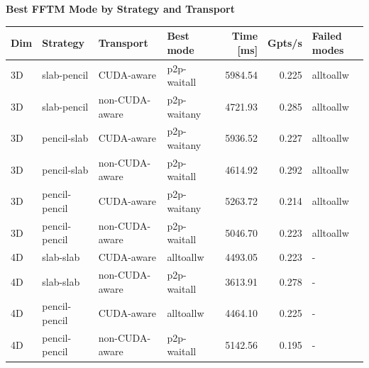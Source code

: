 \documentclass{article}
\begin{document}
\begin{center}
{\fontsize{8.0pt}{9.4pt}\selectfont
\textbf{Best FFTM Mode by Strategy and Transport}

\vspace{0.6em}
\begin{tabular}{llllrrl}
\hline
Dim & Strategy & Transport & Best mode & Time [ms] & Gpts/s & Failed modes \\
\hline
3D & slab-pencil & CUDA-aware & p2p-waitall & 5984.54 & 0.225 & alltoallw \\
3D & slab-pencil & non-CUDA-aware & p2p-waitany & 4721.93 & 0.285 & alltoallw \\
3D & pencil-slab & CUDA-aware & p2p-waitany & 5936.52 & 0.227 & alltoallw \\
3D & pencil-slab & non-CUDA-aware & p2p-waitall & 4614.92 & 0.292 & alltoallw \\
3D & pencil-pencil & CUDA-aware & p2p-waitany & 5263.72 & 0.214 & alltoallw \\
3D & pencil-pencil & non-CUDA-aware & p2p-waitall & 5046.70 & 0.223 & alltoallw \\
4D & slab-slab & CUDA-aware & alltoallw & 4493.05 & 0.223 & - \\
4D & slab-slab & non-CUDA-aware & p2p-waitall & 3613.91 & 0.278 & - \\
4D & pencil-pencil & CUDA-aware & alltoallw & 4464.10 & 0.225 & - \\
4D & pencil-pencil & non-CUDA-aware & p2p-waitall & 5142.56 & 0.195 & - \\
\hline
\end{tabular}
}
\end{center}
\end{document}
